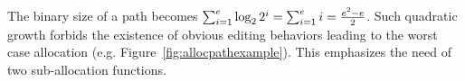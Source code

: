 \noindent The binary size of a path becomes
$\textstyle\sum\nolimits_{i=1}^{e}\log_2{2^i}=\sum\nolimits_{i=1}^{e}i=
{e^2-e\over{2}}$.
Such quadratic growth forbids the existence of obvious editing behaviors leading
to the worst case allocation (e.g. Figure~\ref{fig:allocpathexample}). This
emphasizes the need of two sub-allocation functions.




